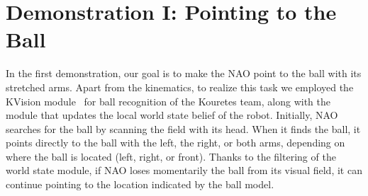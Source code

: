 \section{Demonstration I: Pointing to the Ball}

In the first demonstration, our goal is to make the NAO point to the ball with its stretched arms. Apart from the kinematics, to realize this task we employed the KVision module~\cite{orfanoudakis2011} for ball recognition of the Kouretes team, along with the module that updates the local world state belief of the robot. Initially, NAO searches for the ball by scanning the field with its head. When it finds the ball, it points directly to the ball with the left, the right, or both arms, depending on where the ball is located (left, right, or front). Thanks to the filtering of the world state module, if NAO loses momentarily the ball from its visual field, it can continue pointing to the location indicated by the ball model. 


